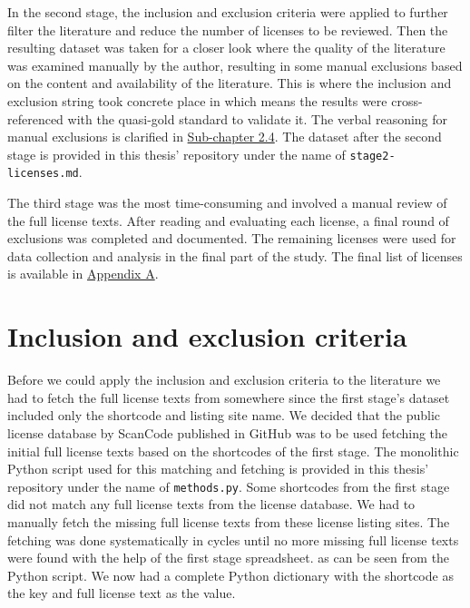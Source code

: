 In the second stage, the inclusion and exclusion criteria were applied to further filter the literature and reduce the number of licenses to be reviewed. Then the resulting dataset was taken for a closer look where the quality of the literature was examined manually by the author, resulting in some manual exclusions based on the content and availability of the literature. This is where the inclusion and exclusion string took concrete place in which means the results were cross-referenced with the quasi-gold standard to validate it. The verbal reasoning for manual exclusions is clarified in \hyperref[incexc-criteria]{Sub-chapter 2.4}. The dataset after the second stage is provided in this thesis' repository \citep{mscthesis} under the name of \texttt{stage2-licenses.md}.

The third stage was the most time-consuming and involved a manual review of the full license texts. After reading and evaluating each license, a final round of exclusions was completed and documented. The remaining licenses were used for data collection and analysis in the final part of the study. The final list of licenses is available in \hyperref[appendix:a]{Appendix A}.

\section{Inclusion and exclusion criteria\label{incexc-criteria}}
Before we could apply the inclusion and exclusion criteria to the literature we had to fetch the full license texts from somewhere since the first stage's dataset included only the shortcode and listing site name. We decided that the public license database by ScanCode published in GitHub \citep{scancode} was to be used fetching the initial full license texts based on the shortcodes of the first stage. The monolithic Python script used for this matching and fetching is provided in this thesis' repository \citep{mscthesis} under the name of \texttt{methods.py}. Some shortcodes from the first stage did not match any full license texts from the license database. We had to manually fetch the missing full license texts from these license listing sites. The fetching was done systematically in cycles until no more missing full license texts were found with the help of the first stage spreadsheet. as can be seen from the Python script. We now had a complete Python dictionary with the shortcode as the key and full license text as the value.

